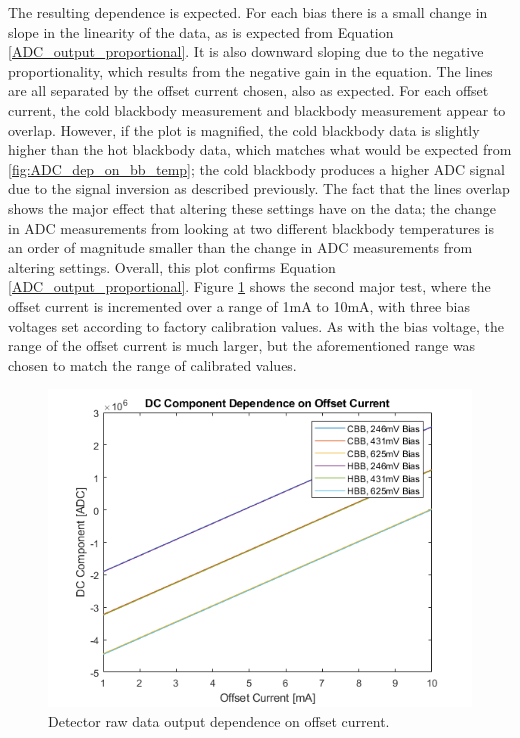 The resulting dependence is expected. For each bias there is a small change in slope in the linearity of the data, as is expected from Equation \ref{ADC_output_proportional}. It is also downward sloping due to the negative proportionality, which results from the negative gain in the equation. The lines are all separated by the offset current chosen, also as expected. For each offset current, the cold blackbody measurement and blackbody measurement appear to overlap. However, if the plot is magnified, the cold blackbody data is slightly higher than the hot blackbody data, which matches what would be expected from \ref{fig:ADC_dep_on_bb_temp}; the cold blackbody produces a higher ADC signal due to the signal inversion as described previously. The fact that the lines overlap shows the major effect that altering these settings have on the data; the change in ADC measurements from looking at two different blackbody temperatures is an order of magnitude smaller than the change in ADC measurements from altering settings. Overall, this plot confirms Equation \ref{ADC_output_proportional}. Figure \ref{fig:dc_dep_on_offset} shows the second major test, where the offset current is incremented over a range of 1mA to 10mA, with three bias voltages set according to factory calibration values. As with the bias voltage, the range of the offset current is much larger, but the aforementioned range was chosen to match the range of calibrated values.

\begin{figure}[h]
  \centering
  \includegraphics[width=0.9\linewidth]{chap6_images/verification/dc_component_dependence_on_offset_current.png}
  \caption{Detector raw data output dependence on offset current.}
  \label{fig:dc_dep_on_offset}
\end{figure}

